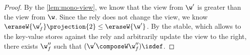 \begin{proof}
By the \cref{lem:mono-view}, we know that the view from \( \w'\) is greater than the view from \( \w \).
Since the rely does not change the view, we know \( \eraseW{\w_f'}\projection{2} \leq \eraseW{\w'} \).
By the stable, which allows to the key-value stores against the rely and arbitrarily update the view to the right, there exists \( \w_{f}'' \) such that \( (\w' \composeW \w_{f}'')\isdef\).


\end{proof}


